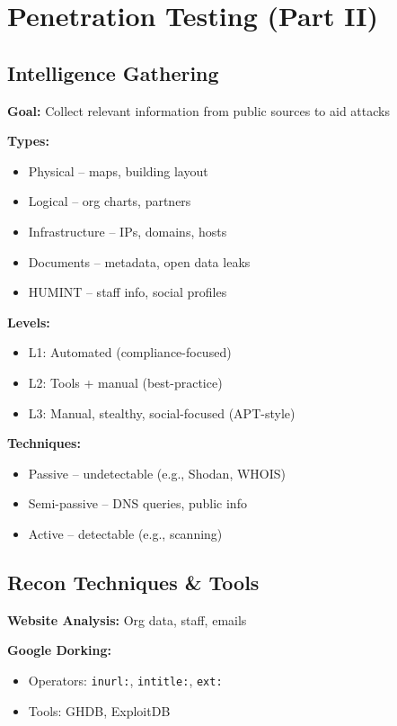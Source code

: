\section{Penetration Testing (Part II)}

\subsection{Intelligence Gathering}

\textbf{Goal:} Collect relevant information from public sources to aid attacks

\textbf{Types:}
\begin{itemize}[noitemsep]
  \item Physical – maps, building layout
  \item Logical – org charts, partners
  \item Infrastructure – IPs, domains, hosts
  \item Documents – metadata, open data leaks
  \item HUMINT – staff info, social profiles
\end{itemize}

\textbf{Levels:}
\begin{itemize}[noitemsep]
  \item L1: Automated (compliance-focused)
  \item L2: Tools + manual (best-practice)
  \item L3: Manual, stealthy, social-focused (APT-style)
\end{itemize}

\textbf{Techniques:}
\begin{itemize}[noitemsep]
  \item Passive – undetectable (e.g., Shodan, WHOIS)
  \item Semi-passive – DNS queries, public info
  \item Active – detectable (e.g., scanning)
\end{itemize}

\subsection{Recon Techniques \& Tools}

\textbf{Website Analysis:} Org data, staff, emails

\textbf{Google Dorking:}
\begin{itemize}[noitemsep]
  \item Operators: \texttt{inurl:}, \texttt{intitle:}, \texttt{ext:}
  \item Tools: GHDB, ExploitDB
\end{itemize}

